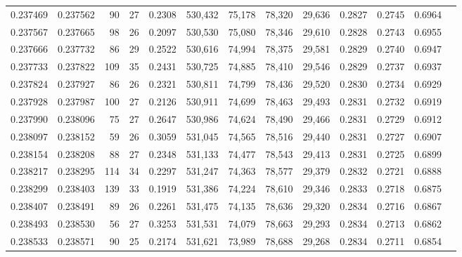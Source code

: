 \begin{tabular}{rrrrrrrrrrrrr}
0.237469 & 0.237562 &  90 &  27 &                                     0.2308 & 530,432 &  75,178 &  78,320 &  29,636 & 0.2827 & 0.2745 & 0.6964 \\
0.237567 & 0.237665 &  98 &  26 &                                     0.2097 & 530,530 &  75,080 &  78,346 &  29,610 & 0.2828 & 0.2743 & 0.6955 \\
0.237666 & 0.237732 &  86 &  29 &                                     0.2522 & 530,616 &  74,994 &  78,375 &  29,581 & 0.2829 & 0.2740 & 0.6947 \\
0.237733 & 0.237822 & 109 &  35 &                                     0.2431 & 530,725 &  74,885 &  78,410 &  29,546 & 0.2829 & 0.2737 & 0.6937 \\
0.237824 & 0.237927 &  86 &  26 &                                     0.2321 & 530,811 &  74,799 &  78,436 &  29,520 & 0.2830 & 0.2734 & 0.6929 \\
0.237928 & 0.237987 & 100 &  27 &                                     0.2126 & 530,911 &  74,699 &  78,463 &  29,493 & 0.2831 & 0.2732 & 0.6919 \\
0.237990 & 0.238096 &  75 &  27 &                                     0.2647 & 530,986 &  74,624 &  78,490 &  29,466 & 0.2831 & 0.2729 & 0.6912 \\
0.238097 & 0.238152 &  59 &  26 &                                     0.3059 & 531,045 &  74,565 &  78,516 &  29,440 & 0.2831 & 0.2727 & 0.6907 \\
0.238154 & 0.238208 &  88 &  27 &                                     0.2348 & 531,133 &  74,477 &  78,543 &  29,413 & 0.2831 & 0.2725 & 0.6899 \\
0.238217 & 0.238295 & 114 &  34 &                                     0.2297 & 531,247 &  74,363 &  78,577 &  29,379 & 0.2832 & 0.2721 & 0.6888 \\
0.238299 & 0.238403 & 139 &  33 &                                     0.1919 & 531,386 &  74,224 &  78,610 &  29,346 & 0.2833 & 0.2718 & 0.6875 \\
0.238407 & 0.238491 &  89 &  26 &                                     0.2261 & 531,475 &  74,135 &  78,636 &  29,320 & 0.2834 & 0.2716 & 0.6867 \\
0.238493 & 0.238530 &  56 &  27 &                                     0.3253 & 531,531 &  74,079 &  78,663 &  29,293 & 0.2834 & 0.2713 & 0.6862 \\
0.238533 & 0.238571 &  90 &  25 &                                     0.2174 & 531,621 &  73,989 &  78,688 &  29,268 & 0.2834 & 0.2711 & 0.6854 \\

\end{tabular}
